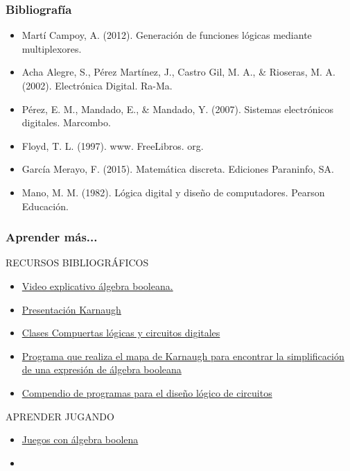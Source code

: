 \documentclass[aspectratio=169]{beamer}
\begin{document}
\begin{frame}
\frametitle{Bibliografía}
\begin{itemize}
    \item Martí Campoy, A. (2012). Generación de funciones lógicas mediante multiplexores.
    \item Acha Alegre, S., Pérez Martínez, J., Castro Gil, M. A., \& Rioseras, M. A. (2002). Electrónica Digital. Ra-Ma.
    \item Pérez, E. M., Mandado, E., \& Mandado, Y. (2007). Sistemas electrónicos digitales. Marcombo.
    \item Floyd, T. L. (1997). www. FreeLibros. org.
    \item García Merayo, F. (2015). Matemática discreta. Ediciones Paraninfo, SA.
    \item Mano, M. M. (1982). Lógica digital y diseño de computadores. Pearson Educación.
\end{itemize}
\end{frame}

\begin{frame}
\frametitle{Aprender más...}
RECURSOS BIBLIOGRÁFICOS
\begin{itemize}
    \item  \href {https://youtu.be/YgaWUWTmQnU}{ Video explicativo álgebra booleana. }   
    \item \href{https://es.slideshare.net/faurbano/clase06-5335816}{ Presentación Karnaugh}
    \item \href{https://www.youtube.com/watch?v=IYz_pKuxrZo&list=PL0_FimzlChzJPSoqfx7-RZs5wK__npj9G}{Clases Compuertas lógicas y circuitos digitales}
    \item \href{https://github.com/zhcHoward/Kmap}{Programa que realiza el mapa de Karnaugh para encontrar la simplificación de una expresión de álgebra booleana}
    \item \href{https://github.com/PyLamGR/Logic-Design-Tools}{Compendio de programas para el diseño lógico de circuitos}
    
\end{itemize}
APRENDER JUGANDO
\begin{itemize}
    \item \href{http://elibrary.matf.bg.ac.rs/bitstream/handle/123456789/297/phdBorisSobot.pdf?sequence=1}{Juegos con álgebra boolena}
    \item \href{}{}
\end{itemize}
\end{frame}


\begin{frame}[plain]
\end{frame}
\end{document}
